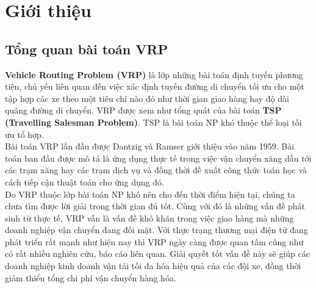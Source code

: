\documentclass[12pt,a4paper]{article}\author{Nguyễn Nho Dũng}
\let\svsection\section
\def\section{\setcounter{figure}{0}\svsection}
\newcommand{\kniem}[1]{{\sffamily\bfseries #1}}
\begin{document}
\section{Giới thiệu}
\subsection{Tổng quan bài toán VRP}
\kniem{Vehicle Routing Problem (VRP)} là lớp những bài toán định tuyến phương tiện, chủ yếu liên quan đến việc xác định tuyến đường di chuyển tối ưu cho một tập hợp các xe theo một tiêu chí nào đó như thời gian giao hàng hay độ dài quãng đường di chuyển. VRP được xem như tổng quát của bài toán \kniem{TSP (Travelling Salesman Problem)}. TSP là bài toán NP khó thuộc thể loại tối ưu tổ hợp.\\[5pt]
Bài toán VRP lần đầu được Dantzig và Ramser giới thiệu vào năm 1959. Bài toán ban đầu được mô tả là ứng dụng thực tế trong việc vận chuyển xăng dầu tới các trạm xăng hay các trạm dịch vụ và đồng thời đề xuất công thức toán học và cách tiếp cận thuật toán cho ứng dụng đó.  \\[5pt]
Do VRP thuộc lớp bài toán NP khó nên cho đến thời điểm hiện tại, chúng ta chưa tìm được lời giải trong thời gian đủ tốt. Cùng với đó là những vấn đề phát sinh từ thực tế, VRP vẫn là vấn đề khó khăn trong việc giao hàng mà những doanh nghiệp vận chuyển đang đối mặt. Với thực trạng thương mại điện tử đang phát triển rất mạnh như hiện nay thì VRP ngày càng được quan tâm cũng như có rất nhiều nghiên cứu, báo cáo liên quan. Giải quyết tốt vấn đề này sẽ giúp các doanh nghiệp kinh doanh vận tải tối đa hóa hiệu quả của các đội xe, đồng thời giảm thiểu tổng chi phí vận chuyển hàng hóa. \\  
\end{document}
